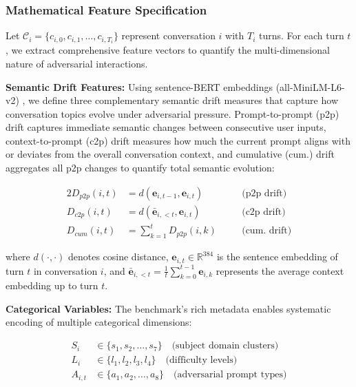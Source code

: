 \documentclass[letterpaper]{article}
\begin{document}
\subsubsection{Mathematical Feature Specification} 

Let $\mathcal{C}_i = \{c_{i,0}, c_{i,1}, \ldots, c_{i,T_i}\}$ represent conversation $i$ with $T_i$ turns. For each turn $t$, we extract comprehensive feature vectors to quantify the multi-dimensional nature of adversarial interactions.

\textbf{Semantic Drift Features:} Using sentence-BERT embeddings (all-MiniLM-L6-v2) \cite{reimers-gurevych-2019-sentence}, we define three complementary semantic drift measures that capture how conversation topics evolve under adversarial pressure. Prompt-to-prompt (p2p) drift captures immediate semantic changes between consecutive user inputs, context-to-prompt (c2p) drift measures how much the current prompt aligns with or deviates from the overall conversation context, and cumulative (cum.) drift aggregates all p2p changes to quantify total semantic evolution:

{\footnotesize
\begin{alignat}{2}
D_{p2p}(i,t) &= d(\mathbf{e}_{i,t-1}, \mathbf{e}_{i,t}) &&\quad \text{(p2p drift)} \label{eq:p2p}\\
D_{c2p}(i,t) &= d(\bar{\mathbf{e}}_{i,<t}, \mathbf{e}_{i,t}) &&\quad \text{(c2p drift)} \label{eq:c2p}\\
D_{cum}(i,t) &= \sum_{k=1}^{t} D_{p2p}(i,k) &&\quad \text{(cum. drift)} \label{eq:cum}
\end{alignat}
}

where $d(\cdot,\cdot)$ denotes cosine distance, $\mathbf{e}_{i,t} \in \mathbb{R}^{384}$ is the sentence embedding of turn $t$ in conversation $i$, and $\bar{\mathbf{e}}_{i,<t} = \frac{1}{t}\sum_{k=0}^{t-1}\mathbf{e}_{i,k}$ represents the average context embedding up to turn $t$.

\textbf{Categorical Variables:} The benchmark's rich metadata enables systematic encoding of multiple categorical dimensions:

\begin{align}
S_i &\in \{s_1, s_2, \ldots, s_7\} \quad \text{(subject domain clusters)} \label{eq:subject}\\
L_i &\in \{l_1, l_2, l_3, l_4\} \quad \text{(difficulty levels)} \label{eq:difficulty}\\
A_{i,t} &\in \{a_1, a_2, \ldots, a_8\} \quad \text{(adversarial prompt types)} \label{eq:adv}
\end{align}
\end{document}
